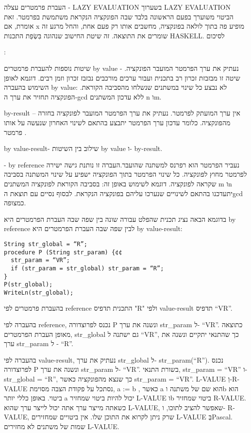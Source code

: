         העברת פרמטרים עצלה - LAZY EVALUATION
        בשערוך LAZY EVALUATION הביטוי משוערך בפעם הראשונה בלבד שבה הפונקציה הנקראת משתמשת בפרמטר.
        זאת אומרת, אם x מופיע פה בתוך לולאה בפונקציה, מחשבים אותו רק פעם אחת, והחל מרגע זה שומרים את התוצאה. זה שיטת החישוב שנהוגה בִּשְׂפַת התכנות HASKELL.
        לסיכום

        :

        שיטות נוספות להעברת פרמטרים
        by value - נעתיק את ערך הפרמטר המועבר הפונקציה. שיטה זו מבזבזת זכרון רב בתכנית ועבור ערכים מורכבים נבזבז זכרון וזמן רבים.
        דוגמא לאופן השימוש בהעברה by value:
        לא נבצע כל שינוי במשתנים שנשלחו מהסביבה הקוראת.
        הפונקציה תחזיר את ערך ה-gcd ללא עדכון המשתנים n וm.

        by-result – אין ערך המועתק לפרמטר. נעתיק את ערך הפרמטר המועבר לפונקציה בחזרה מהפונקציה. כלומר עדכון ערך הפרמטר יתבצע בהתאם לשינוי האחרון שנעשה על אותו פרמטר .

        by value-result- שילוב בין השיטות by value ו- by-result.

        - by reference נעביר הפרמטר הוא רפרנס למשתנה שהועבר.העברה זו נותנת גישה ישירה לפרמטר מחוץ לפונקציה. כל שינוי הפרמטר בתוך הפונקציה ישפיע על שינוי המשתנה בסביבה שקראה לפונקציה.
        דוגמא לשימוש באופן זה:
        בסביבה הקוראת לפונקציה המשתנים m וn יתעדכנו בהתאם לשינויים שנערכו עליהם בפונקציה הנקראת.
        לבסוף נסיים עם תוצאת הgcd כמצופה.

        בדוגמא הבאה נציג תכנית שהפלט עבורה שונה בין שפה שבה העברת הפרמטרים היא by reference לבין שפה שבה העברת הפרמטרים היא by value-result:
\begin{verbatim}
String str_global = “R”;
procedure P (String str_param) {¢¢
  str_param = “VR”;
  if (str_param = str_global) str_param = “R”;
}
P(str_global);
WriteLn(str_global);
\end{verbatim}
        בהעברת פרמטרים לפי reference התכנית תדפיס "R" ולפי value-result תדפיס “VR”.

        בהעברה לפי reference, נכנס לפרוצדורה P ונשנה את ערך str\_param ל- “VR”. כתוצאה מאופן העברת הפרמטרים, str\_global גם ישתנה ל “VR”, כך שהתנאי יתקיים ונשנה את ערך str\_param ל - “R”.

        בהעברה לפי value-result, נעתיק את ערך str\_global ל- str\_param(“R”).
        נכנס לפרוצדורה P ונשנה את ערך str\_param ל- “VR”.
        בשורת התנאי, str\_param = “VR” ו- str\_global = “R”, כך שנצא מהפונקציה כאשר str\_param = “VR”.
        L-VALUE וְ-R-VALUE
        נסתכל על פקודת הצבה מסוימת, a := b , כאשר a הוא שם של משתנה וb הוא ביטוי.
        באופן כללי יותר a יכול להיות ביטוי שמחזיר L-VALUE וb ביטוי שמחזיר R-VALUE.
        כשאתה מייצר ערך אתה יכול לייצר ערך שהוא L-VALUE, שאפשר להציב לתוכו, ו- R-VALUE, שרק ניתן לקרוא את התוכן שלו.
        אין ביטויים שמחזירים L-VALUE בְּPascal. שמות של משתנים לא מחזירים L-VALUE.

